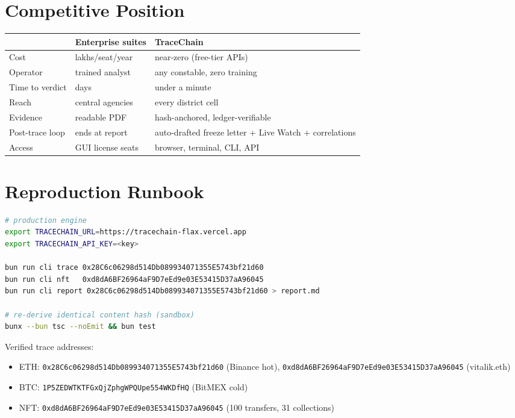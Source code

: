 \documentclass[11pt,a4paper]{article}
\begin{document}
\section{Competitive Position}

\begin{longtable}{@{}p{}p{}p{}@{}}
\toprule
& \textbf{Enterprise suites} & \textbf{TraceChain} \\
\midrule
Cost & lakhs/seat/year & near-zero (free-tier APIs) \\
Operator & trained analyst & any constable, zero training \\
Time to verdict & days & under a minute \\
Reach & central agencies & every district cell \\
Evidence & readable PDF & hash-anchored, ledger-verifiable \\
Post-trace loop & ends at report & auto-drafted freeze letter + Live Watch + correlations \\
Access & GUI license seats & browser, terminal, CLI, API \\
\bottomrule
\end{longtable}

\section{Reproduction Runbook}

\begin{lstlisting}[language=bash]
# production engine
export TRACECHAIN_URL=https://tracechain-flax.vercel.app
export TRACECHAIN_API_KEY=<key>

bun run cli trace 0x28C6c06298d514Db089934071355E5743bf21d60
bun run cli nft   0xd8dA6BF26964aF9D7eEd9e03E53415D37aA96045
bun run cli report 0x28C6c06298d514Db089934071355E5743bf21d60 > report.md

# re-derive identical content hash (sandbox)
bunx --bun tsc --noEmit && bun test
\end{lstlisting}

Verified trace addresses:
\begin{itemize}[itemsep=0.03em]
  \item ETH: \texttt{0x28C6c06298d514Db089934071355E5743bf21d60} (Binance hot),
  \texttt{0xd8dA6BF26964aF9D7eEd9e03E53415D37aA96045} (vitalik.eth)
  \item BTC: \texttt{1P5ZEDWTKTFGxQjZphgWPQUpe554WKDfHQ} (BitMEX cold)
  \item NFT: \texttt{0xd8dA6BF26964aF9D7eEd9e03E53415D37aA96045} (100 transfers, 31 collections)
\end{itemize}
\end{document}
